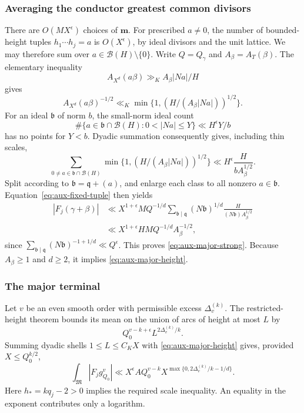 \documentclass[11pt]{amsart}
\theoremstyle{definition}
\numberwithin{equation}{section}
\begin{document}
\subsubsection{Averaging the conductor greatest common divisors}

There are $O(MX^\epsilon)$ choices of $\mathbf m$.
For prescribed $a\ne0$, the number of bounded-height tuples
$h_1\cdots h_j=a$ is $O(X^\epsilon)$, by ideal divisors and the unit
lattice.  We may therefore sum over $a\in\mathcal B(H)\setminus\{0\}$.
Write $Q=Q_\gamma$ and $A_\beta=A_T(\beta)$. The elementary inequality
\[
 A_{X^d}(a\beta)\gg_K A_\beta|Na|/H
\]
gives
\[
 A_{X^d}(a\beta)^{-1/2}
 \ll_K\min\{1,(H/(A_\beta|Na|))^{1/2}\}.
\]
For an ideal $\mathfrak b$ of norm $b$, the small-norm ideal count
\[
 \#\{a\in\mathfrak b\cap\mathcal B(H):0<|Na|\le Y\}
       \ll H^\epsilon Y/b
\]
has no points for $Y<b$.  Dyadic summation consequently gives, including
thin scales,
\[
 \sum_{0\ne a\in\mathfrak b\cap\mathcal B(H)}
       \min\{1,(H/(A_\beta|Na|))^{1/2}\}
 \ll H^\epsilon\frac{H}{bA_\beta^{1/2}}.
\]
Split according to $\mathfrak b=\mathfrak q+(a)$, and enlarge each class
to all nonzero $a\in\mathfrak b$.  Equation~\eqref{eq:aux-fixed-tuple} then
yields
\begin{align*}
 |F_j(\gamma+\beta)|
 &\ll X^{1+\epsilon}M Q^{-1/d}
       \sum_{\mathfrak b\mid\mathfrak q}(N\mathfrak b)^{1/d}
         \frac{H}{(N\mathfrak b)A_\beta^{1/2}}\\
 &\ll X^{1+\epsilon}HM Q^{-1/d}A_\beta^{-1/2},
\end{align*}
since $\sum_{\mathfrak b\mid\mathfrak q}(N\mathfrak b)^{-1+1/d}
\ll Q^\epsilon$.  This proves \eqref{eq:aux-major-strong}.
Because $A_\beta\ge1$ and $d\ge2$, it implies \eqref{eq:aux-major-height}.

\subsubsection{The major terminal}

Let $v$ be an even smooth order with permissible excess $\Delta_v^{(k)}$.
The restricted-height theorem bounds its mean on the union of arcs
of height at most $L$ by
\[
 Q_0^{v-k+\epsilon}L^{2\Delta_v^{(k)}/k}.
\]
Summing dyadic shells $1\le L\le C_KX$ with
\eqref{eq:aux-major-height} gives, provided $X\le Q_0^{k/2}$,
\begin{equation}\label{eq:quadratic-terminal-major-integral}
 \int_{\mathfrak M}|F_jg_{Q_0}^v|
 \ll X^\epsilon A Q_0^{v-k}
       X^{\max\{0,2\Delta_v^{(k)}/k-1/d\}}.
\end{equation}
Here $h_*=kq_j-2>0$ implies the required scale inequality.
An equality in the exponent contributes only a logarithm.
\end{document}

